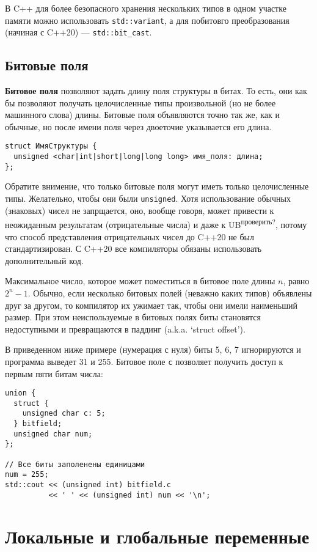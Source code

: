 \documentclass[14pt, a4paper]{extarticle}
\begin{document}
{\small В C++ для более безопасного хранения нескольких типов в одном участке памяти можно использовать
\verb|std::variant|, а для побитовго преобразования (начиная с C++20) --- \verb|std::bit_cast|.}

\subsection*{Битовые поля}
\textbf{Битовое поля} позволяют задать длину поля структуры в битах. %
То есть, они как бы позволяют получать целочисленные типы произвольной (но не
более машинного слова) длины. Битовые поля объявляются точно так же, как и обычные,
но после имени поля через двоеточие указывается его длина.
\begin{verbatim}
struct ИмяСтруктуры {
  unsigned <char|int|short|long|long long> имя_поля: длина;
};
\end{verbatim}

Обратите внимение, что только битовые поля могут иметь только целочисленные типы.
{\small Желательно, чтобы они были \verb|unsigned|. Хотя использование обычных (знаковых)
чисел не запрщается, оно, вообще говоря, может привести к неожиданным результатам (отрицательные числа) и даже к UB\textsuperscript{проверить?},
потому что способ представления отрицательных чисел до C++20 не был стандартизирован.
С C++20 все компиляторы обязаны использовать дополнительный код.}

Максимальное число, которое может поместиться в битовое поле длины $n$, равно $2^n - 1$.
Обычно, если несколько битовых полей (неважно каких типов) объявлены друг за другом, то
компилятор их ужимает так, чтобы они имели наименьший размер. При этом неиспользуемые в
битовых полях биты становятся недоступными и превращаются в паддинг (a.k.a. `struct offset').

В приведенном ниже примере (нумерация с нуля) биты 5, 6, 7 игнорируются и программа
выведет 31 и 255. Битовое поле \verb|c| позволяет получить доступ к первым пяти битам числа:
\begin{verbatim}
union {
  struct {
    unsigned char c: 5;
  } bitfield;
  unsigned char num;
};

// Все биты заполенены единицами
num = 255;
std::cout << (unsigned int) bitfield.c
          << ' ' << (unsigned int) num << '\n';
\end{verbatim}


\section{Локальные и глобальные переменные}
\end{document}
